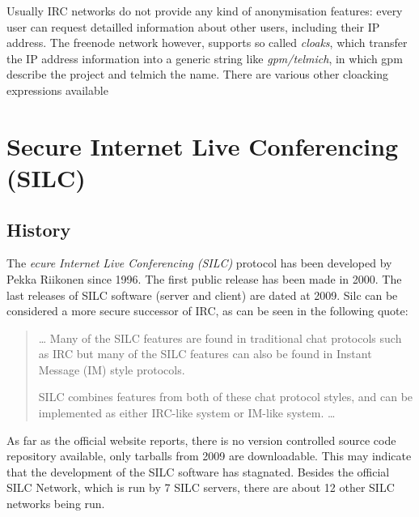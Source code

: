 Usually IRC networks do not provide any kind of anonymisation features:
every user can request detailled information about other users, including
their IP address.  The freenode network\cite{freenode} however,
supports so called \textit{cloaks}, which transfer the IP address information
into a generic string like \textit{gpm/telmich}, in which gpm describe the
project and telmich the name. There are various other cloacking expressions
available
\section{Secure Internet Live Conferencing (SILC)}
\subsection{History}
The \textit{ecure Internet Live Conferencing (SILC)} protocol
has been developed by Pekka Riikonen since 1996. The first public release
has been made in 2000. The last releases of SILC software (server and client)
are dated at 2009. Silc can be considered a more secure successor of IRC,
as can be seen in the following quote:
\begin{quote}
\ldots{}
Many of the SILC features are found in traditional chat protocols such 
as IRC but many of the SILC features can also be found in 
Instant Message (IM) style protocols.

SILC combines features from both of these chat protocol styles, 
and can be implemented as either IRC-like system 
or IM-like system. \ldots{}\cite{silcwp}
\end{quote}
As far as the official website reports,
there is no version controlled source code repository available,
only tarballs from 2009 are downloadable. This may indicate that the
development of the SILC software has stagnated.
Besides the official SILC Network, which is run by 7 SILC servers,
there are about 12 other SILC networks being run.\cite{wiki:silc}
